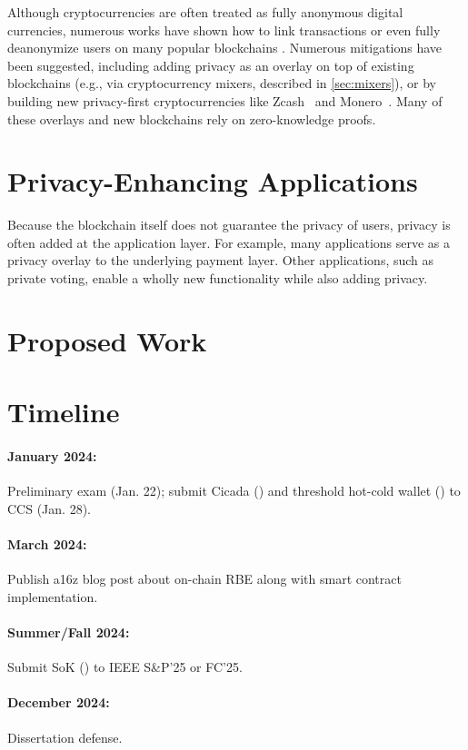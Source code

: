 \documentclass{article}
\begin{document}
Although cryptocurrencies are often treated as fully anonymous digital currencies, numerous works have shown how to link transactions or even fully deanonymize users on many popular blockchains \cite{CCS:BirKhoPus14,EuroSP:BirTik19,FC:KosKosMcD14,PoPETS:MSHLHSHHMNC18,USENIX:KYMM18}. Numerous mitigations have been suggested, including adding privacy as an overlay on top of existing blockchains (e.g., via cryptocurrency mixers, described in \cref{sec:mixers}), or by building new privacy-first cryptocurrencies like Zcash~\cite{zcash} and Monero~\cite{monero}. Many of these overlays and new blockchains rely on zero-knowledge proofs.



\section{Privacy-Enhancing Applications}\label{sec:applications}

Because the blockchain itself does not guarantee the privacy of users, privacy is often added at the application layer. For example, many applications serve as a privacy overlay to the underlying payment layer. Other applications, such as private voting, enable a wholly new functionality while also adding privacy.




\section{Proposed Work}\label{sec:proposed}



\section{Timeline}

\paragraph{January 2024:} Preliminary exam (Jan. 22); submit Cicada () and threshold hot-cold wallet () to CCS (Jan. 28).

\paragraph{March 2024:} Publish a16z blog post about on-chain RBE along with smart contract implementation.

\paragraph{Summer/Fall 2024:} Submit SoK () to IEEE S\&P'25 or FC'25.

\paragraph{December 2024:} Dissertation defense.

{\small


}
\end{document}
